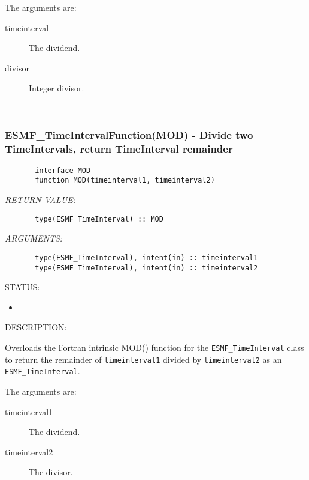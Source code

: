        The arguments are:
       \begin{description}
       \item[timeinterval]
            The dividend.
       \item[divisor]
            Integer divisor.
       \end{description}
   
 
\mbox{}\hrulefill\ 
 
\subsubsection [ESMF\_TimeIntervalFunction(MOD)] {ESMF\_TimeIntervalFunction(MOD) - Divide two TimeIntervals, return TimeInterval remainder}


  
\begin{verbatim}       interface MOD
       function MOD(timeinterval1, timeinterval2)\end{verbatim}{\em RETURN VALUE:}
\begin{verbatim}       type(ESMF_TimeInterval) :: MOD\end{verbatim}{\em ARGUMENTS:}
\begin{verbatim}       type(ESMF_TimeInterval), intent(in) :: timeinterval1
       type(ESMF_TimeInterval), intent(in) :: timeinterval2\end{verbatim}
{\sf STATUS:}
   \begin{itemize}
   \item{}
   \end{itemize}
  
{\sf DESCRIPTION:\\ }


       Overloads the Fortran intrinsic MOD() function for the
       {\tt ESMF\_TimeInterval} class to return the remainder of 
       {\tt timeinterval1} divided by {\tt timeinterval2} as an 
       {\tt ESMF\_TimeInterval}.
  
       The arguments are:
       \begin{description}
       \item[timeinterval1]
            The dividend.
       \item[timeinterval2]
            The divisor.
       \end{description}
   
 
